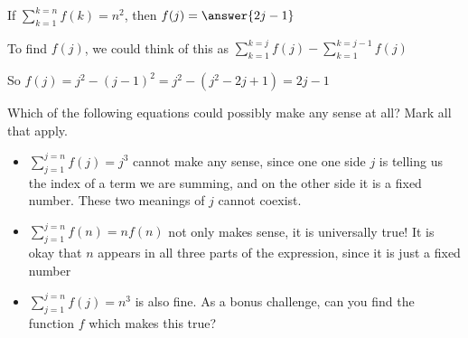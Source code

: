 \documentclass{ximera}
\begin{document}
\begin{question}
	If $\sum_{k=1}^{k=n} f(k) = n^2$, then $f(j) = \answer{2j-1}$
		\begin{hint}
			To find $f(j)$, we could think of this as $\sum_{k=1}^{k=j} f(j) - \sum_{k=1}^{k=j-1} f(j)$
		\end{hint}
		\begin{hint}
			So $f(j) = j^2 - (j-1)^2 = j^2- (j^2-2j+1) = 2j-1$
		\end{hint}
\end{question}

\begin{question}
	Which of the following equations could possibly make any sense at all?  Mark all that apply.
	
	\begin{multiple-choice}
	\end{multiple-choice}
	
	\begin{hint}
		\begin{itemize}
		\item $\sum_{j=1}^{j=n} f(j) = j^3$ cannot make any sense, since one one side $j$ is telling us the index of a term we are summing, and on the other side it is a fixed number.  These two meanings of $j$ cannot coexist.
		\item $\sum_{j=1}^{j=n} f(n) = nf(n)$ not only makes sense, it is universally true!  It is okay that $n$ appears in all three parts of the expression, since it is just a fixed number
		\item $\sum_{j=1}^{j=n} f(j) = n^3$ is also fine.  As a bonus challenge, can you find the function $f$ which makes this true?
		\end{itemize}
	\end{hint}
\end{question}
\end{document}
